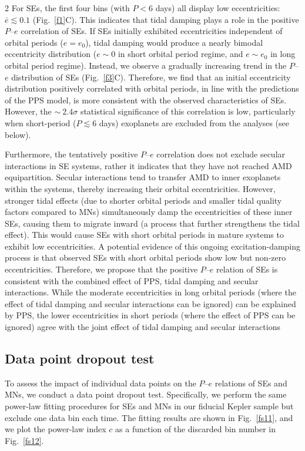 \documentclass[10pt]{article}
\begin{document}
\begin{multicols}{2}
For SEs, the first four bins (with $P<6$ days) all display low eccentricities: $\bar{e}\lesssim0.1$ (Fig.~\ref{f1}C).
This indicates that tidal damping plays a role in the positive $P$--$e$ correlation of SEs.
If SEs initially exhibited eccentricities independent of orbital periods ($e=e_0$), tidal damping would produce a nearly bimodal eccentricity distribution ($e\sim0$ in short orbital period regime, and $e\sim e_0$ in long orbital period regime).
Instead, we observe a gradually increasing trend in the $P$--$e$ distribution of SEs (Fig.~\ref{f3}C).
Therefore, we find that an initial eccentricity distribution positively correlated with orbital periods, in line with the predictions of the PPS model, is more consistent with the observed characteristics of SEs.
However, the $\sim~2.4\sigma$ statistical significance of this correlation is low, particularly when short-period ($P\lesssim6$ days) exoplanets are excluded from the analyses (see below).

Furthermore, the tentatively positive $P$--$e$ correlation does not exclude secular interactions in SE systems, rather it indicates that they have not reached AMD equipartition.
Secular interactions tend to transfer AMD to inner exoplanets within the systems, thereby increasing their orbital eccentricities.
However, stronger tidal effects (due to shorter orbital periods and smaller tidal quality factors compared to MNs) simultaneously damp the eccentricities of these inner SEs, causing them to migrate inward (a process that further strengthens the tidal effect).
This would cause SEs with short orbital periods in mature systems to exhibit low eccentricities.
A potential evidence of this ongoing excitation-damping process is that observed SEs with short orbital periods show low but non-zero eccentricities\cite{2020A&A...635A..37C,2024AJ....168..115B}.
Therefore, we propose that the positive $P$--$e$ relation of SEs is consistent with the combined effect of PPS, tidal damping and secular interactions.
While the moderate eccentricities in long orbital periods (where the effect of tidal damping and secular interactions can be ignored) can be explained by PPS, the lower eccentricities in short periods (where the effect of PPS can be ignored) agree with the joint effect of tidal damping and secular interactions

\subsection*{\hypertarget{s4}{Data point dropout test}}
\noindent To assess the impact of individual data points on the $P$--$e$ relations of SEs and MNs, we conduct a data point dropout test.
Specifically, we perform the same power-law fitting procedures for SEs and MNs in our fiducial Kepler sample but exclude one data bin each time.
The fitting results are shown in Fig.~\ref{fs11}, and we plot the power-law index $c$ as a function of the discarded bin number in Fig.~\ref{fs12}.


\end{multicols}
\end{document}
